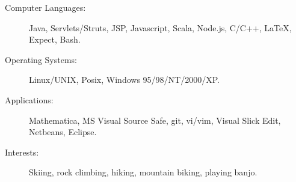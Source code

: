 

\begin{description}
\item[Computer Languages:]
Java, Servlets/Struts, JSP, Javascript, Scala, Node.js, C/C++, \LaTeX, Expect, Bash.
\item[Operating Systems:]
Linux/UNIX, Posix, Windows 95/98/NT/2000/XP.
\item[Applications:]
Mathematica, MS Visual Source Safe, git,  vi/vim, Visual Slick Edit, Netbeans, Eclipse.
\item[Interests:]
Skiing, rock climbing, hiking, mountain biking, playing banjo.
\end{description}
